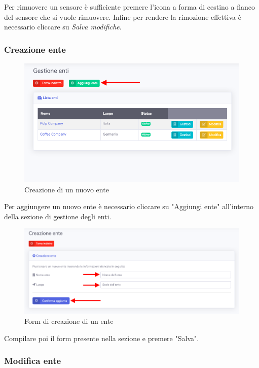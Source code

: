 		Per rimuovere un sensore è sufficiente premere l'icona a forma di cestino a fianco del sensore che si vuole rimuovere. Infine per rendere la rimozione effettiva è necessario cliccare su \textit{Salva modifiche}. 

	\subsubsection{Creazione ente}

		\begin{figure}[H]
		\centering
		\includegraphics[scale=0.600]{res/images/admin/selCreazEnte.png}
		\caption{Creazione di un nuovo ente}
		\end{figure}

		Per aggiungere un nuovo ente è necessario cliccare su "Aggiungi ente" all'interno della sezione di gestione degli enti. 

		\begin{figure}[H]
		\centering
		\includegraphics[scale=0.480]{res/images/admin/creazEnte.png}
		\caption{Form di creazione di un ente}
	\end{figure}

		Compilare poi il form presente nella sezione e premere "Salva".


	\subsubsection{Modifica ente}

